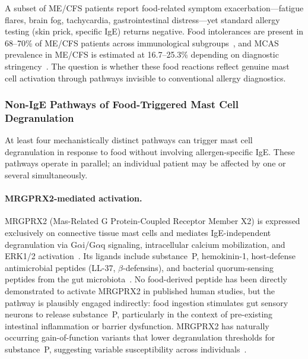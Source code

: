 A subset of ME/CFS patients report food-related symptom exacerbation---fatigue flares, brain fog, tachycardia, gastrointestinal distress---yet standard allergy testing (skin prick, specific IgE) returns negative. Food intolerances are present in 68--70\% of ME/CFS patients across immunological subgroups~\cite{Rohrhofer2024stratification}, and MCAS prevalence in ME/CFS is estimated at 16.7--25.3\% depending on diagnostic stringency~\cite{Rohrhofer2025mecfsmast}. The question is whether these food reactions reflect genuine mast cell activation through pathways invisible to conventional allergy diagnostics.

\subsubsection{Non-IgE Pathways of Food-Triggered Mast Cell Degranulation}

At least four mechanistically distinct pathways can trigger mast cell degranulation in response to food without involving allergen-specific IgE. These pathways operate in parallel; an individual patient may be affected by one or several simultaneously.

\paragraph{MRGPRX2-mediated activation.}
MRGPRX2 (Mas-Related G Protein-Coupled Receptor Member X2) is expressed exclusively on connective tissue mast cells and mediates IgE-independent degranulation via G$\alpha$i/G$\alpha$q signaling, intracellular calcium mobilization, and ERK1/2 activation~\cite{Roy2021mrgprx2}. Its ligands include substance~P, hemokinin-1, host-defense antimicrobial peptides (LL-37, $\beta$-defensins), and bacterial quorum-sensing peptides from the gut microbiota~\cite{Thapaliya2022mrgprx2neuro}. No food-derived peptide has been directly demonstrated to activate MRGPRX2 in published human studies, but the pathway is plausibly engaged indirectly: food ingestion stimulates gut sensory neurons to release substance~P, particularly in the context of pre-existing intestinal inflammation or barrier dysfunction. MRGPRX2 has naturally occurring gain-of-function variants that lower degranulation thresholds for substance~P, suggesting variable susceptibility across individuals~\cite{Roy2021mrgprx2}.

